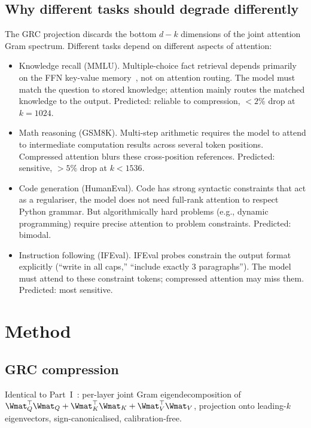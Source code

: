 \documentclass[11pt]{article}
\begin{document}
\subsection{Why different tasks should degrade differently}

The GRC projection discards the bottom $d-k$ dimensions of the joint
attention Gram spectrum.  Different tasks depend on different aspects of
attention:

\begin{itemize}
\item Knowledge recall (MMLU).  Multiple-choice fact retrieval
      depends primarily on the FFN key-value memory~\cite{geva2021ffn},
      not on attention routing.  The model must match the question to
      stored knowledge; attention mainly routes the matched knowledge
      to the output.  Predicted: reliable to compression, $<2\%$ drop at
      $k{=}1024$.

\item Math reasoning (GSM8K).  Multi-step arithmetic requires
      the model to attend to intermediate computation results across
      several token positions.  Compressed attention blurs these
      cross-position references.  Predicted: sensitive, $>5\%$ drop
      at $k{<}1536$.

\item Code generation (HumanEval).  Code has strong syntactic
      constraints that act as a regulariser, the model does not need
      full-rank attention to respect Python grammar.  But algorithmically
      hard problems (e.g., dynamic programming) require precise
      attention to problem constraints.  Predicted: bimodal.

\item Instruction following (IFEval).  IFEval probes constrain
      the output format explicitly (``write in all caps,'' ``include
      exactly 3 paragraphs'').  The model must attend to these
      constraint tokens; compressed attention may miss them.  Predicted:
      most sensitive.
\end{itemize}

\section{Method}
\label{sec:method}

\subsection{GRC compression}
Identical to Part~I~\cite{stewart2026grc}: per-layer joint Gram
eigendecomposition of $\Wmat_Q^\top\Wmat_Q+\Wmat_K^\top\Wmat_K+
\Wmat_V^\top\Wmat_V$, projection onto leading-$k$ eigenvectors,
sign-canonicalised, calibration-free.
\end{document}
